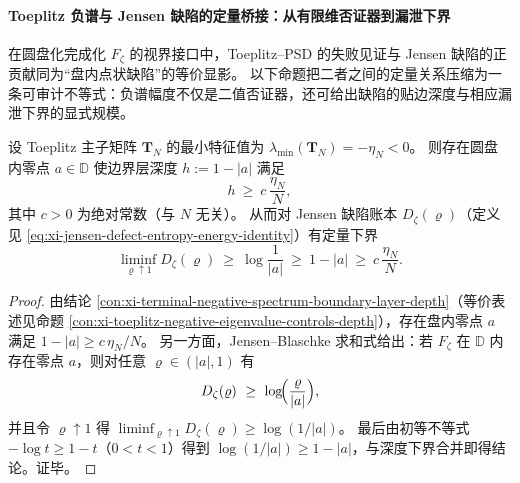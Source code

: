 \paragraph{Toeplitz 负谱与 Jensen 缺陷的定量桥接：从有限维否证器到漏泄下界}
在圆盘化完成化 \(F_\zeta\) 的视界接口中，Toeplitz--PSD 的失败见证与 Jensen 缺陷的正贡献同为“盘内点状缺陷”的等价显影。
以下命题把二者之间的定量关系压缩为一条可审计不等式：负谱幅度不仅是二值否证器，还可给出缺陷的贴边深度与相应漏泄下界的显式规模。

\begin{proposition}\label{prop:xi-toeplitz-negative-eigenvalue-implies-jensen-defect-lb}
设 Toeplitz 主子矩阵 \(\mathbf{T}_N\) 的最小特征值为 \(\lambda_{\min}(\mathbf{T}_N)=-\eta_N<0\)。
则存在圆盘内零点 \(a\in\mathbb{D}\) 使边界层深度 \(h:=1-|a|\) 满足
\[
h\ \ge\ c\,\frac{\eta_N}{N},
\]
其中 \(c>0\) 为绝对常数（与 \(N\) 无关）。
从而对 Jensen 缺陷账本 \(D_\zeta(\varrho)\)（定义见 \eqref{eq:xi-jensen-defect-entropy-energy-identity}）有定量下界
\[
\liminf_{\varrho\uparrow 1}D_\zeta(\varrho)\ \ge\ \log\!\frac{1}{|a|}\ \ge\ 1-|a|\ \ge\ c\,\frac{\eta_N}{N}.
\]
\end{proposition}

\begin{proof}
由结论 \ref{con:xi-terminal-negative-spectrum-boundary-layer-depth}（等价表述见命题 \ref{con:xi-toeplitz-negative-eigenvalue-controls-depth}），存在盘内零点 \(a\) 满足 \(1-|a|\ge c\,\eta_N/N\)。
另一方面，Jensen--Blaschke 求和式给出：若 \(F_\zeta\) 在 \(\mathbb{D}\) 内存在零点 \(a\)，则对任意 \(\varrho\in(|a|,1)\) 有
\[
D_\zeta(\varrho)\ \ge\ \log\!\Bigl(\frac{\varrho}{|a|}\Bigr),
\]
并且令 \(\varrho\uparrow 1\) 得 \(\liminf_{\varrho\uparrow 1}D_\zeta(\varrho)\ge \log(1/|a|)\)。
最后由初等不等式 \(-\log t\ge 1-t\)（\(0<t<1\)）得到 \(\log(1/|a|)\ge 1-|a|\)，与深度下界合并即得结论。证毕。
\end{proof}

